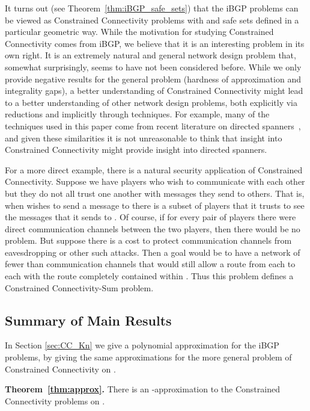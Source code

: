 \documentclass[11pt,letterpaper]{article}
\theoremstyle{definition}
\begin{document}
It turns out (see Theorem~\ref{thm:iBGP_safe_sets}) that the iBGP problems can be viewed as Constrained Connectivity problems with  and safe sets defined in a particular geometric way.  While the motivation for studying Constrained Connectivity comes from iBGP, we believe that it is an interesting problem in its own right.  It is an extremely natural and general network design problem that, somewhat surprisingly, seems to have not been considered before.  While we only provide negative results for the general problem (hardness of approximation and integrality gaps), a better understanding of Constrained Connectivity might lead to a better understanding of other network design problems, both explicitly via reductions and implicitly through techniques.  For example, many of the techniques used in this paper come from recent literature on directed spanners~\cite{BGJRW09,DK11,BBMRY11}, and given these similarities it is not unreasonable to think that insight into Constrained Connectivity might provide insight into directed spanners.

For a more direct example, there is a natural security application of Constrained Connectivity.  Suppose we have  players who wish to communicate with each other
but they do not all trust one another with messages they send to others.
That is, when  wishes to send a message to  there is a subset
 of players that it trusts to see the messages that it sends to .
Of course, if for every pair of players there were direct communication
channels between the two players, then there would be no problem.
But suppose there is a cost to protect communication channels from
eavesdropping or other such attacks.
Then a goal would be to have a network of fewer than 
communication channels that would still allow a route from
each  to each  with the route completely contained within .
Thus this problem defines a {\sc Constrained Connectivity-Sum} problem.




\subsection{Summary of Main Results}

In Section \ref{sec:CC_Kn} we
give a polynomial approximation for the iBGP problems, by giving the same approximations for the more general problem of Constrained Connectivity on .

\vspace{.1in}
{\bf Theorem~\ref{thm:approx}.}\hspace{.01in}
  There is an -approximation to the Constrained
  Connectivity problems on .
\vspace{.1in}
\end{document}
